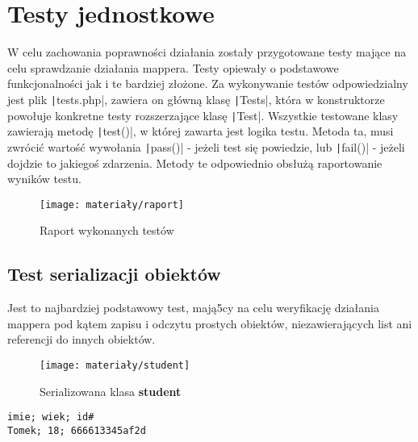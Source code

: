 \section{Testy jednostkowe}
W celu zachowania poprawności działania zostały przygotowane testy mające na celu sprawdzanie działania mappera. Testy opiewały o podstawowe funkcjonalności jak i te bardziej złożone. Za wykonywanie testów odpowiedzialny jest plik \texttt|tests.php|, zawiera on główną klasę \texttt|Tests|, która w konstruktorze powołuje konkretne testy rozszerzające klasę \texttt|Test|. Wszystkie testowane klasy zawierają metodę \texttt|test()|, w której zawarta jest logika testu. Metoda ta, musi zwrócić wartość wywołania  \texttt|pass()| - jeżeli test się powiedzie, lub \texttt|fail()| - jeżeli dojdzie to jakiegoś zdarzenia. Metody te odpowiednio obsłużą raportowanie wyników testu. 

\begin{figure}[ht]
	\centering
	\texttt{[image: materiały/raport]}
	\caption{Raport wykonanych testów}
\end{figure}

\subsection{Test serializacji obiektów}
Jest to najbardziej podstawowy test, mają5cy na celu weryfikację działania mappera pod kątem zapisu i odczytu prostych obiektów, niezawierających list ani referencji do innych obiektów.

\begin{figure}[ht]
	\centering
	\texttt{[image: materiały/student]}
	\caption{Serializowana klasa \textbf{student}}
\end{figure}


\begin{empty}
	\begin{verbatim}
imie; wiek; id#
Tomek; 18; 666613345af2d
	\end{verbatim}
	\vspace{-10pt}
\end{empty}



